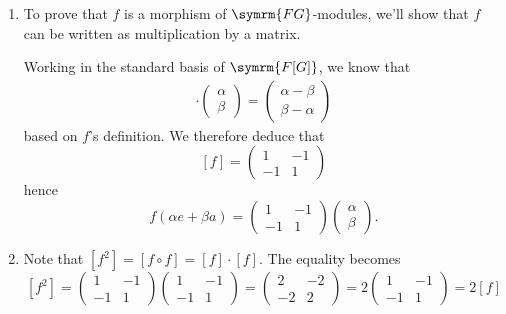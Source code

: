\begin{solution}
\begin{enumerate}[1)]
    \item To prove that \(f\) is a morphism of \(\symrm{FG}\)-modules, we'll show that \(f\) can be written as multiplication by a matrix.
    
    Working in the standard basis of \(\symrm{F[G]}\), we know that
    \begin{align*}
        [f] \cdot \begin{pmatrix} \alpha \\ \beta \end{pmatrix} = \begin{pmatrix}
            \alpha - \beta \\
            \beta - \alpha
        \end{pmatrix}
    \end{align*}
    based on \(f\)'s definition. We therefore deduce that
    \[
        [f] = \begin{pmatrix}
            1 & -1 \\
            -1 & 1
        \end{pmatrix}
    \]
    hence
    \[
        f(\alpha e + \beta a) = \begin{pmatrix}
            1 & -1 \\
            -1 & 1
        \end{pmatrix} \begin{pmatrix}
            \alpha \\
            \beta
        \end{pmatrix}.
    \]
    
    \item Note that \([f^2] = [f \circ f] = [f] \cdot [f]\). The equality becomes
    \[
        [f^2] = \begin{pmatrix}
            1 & -1 \\
            -1 & 1
        \end{pmatrix} \begin{pmatrix}
            1 & -1 \\
            -1 & 1
        \end{pmatrix} =
        \begin{pmatrix}
            2 & -2 \\
            -2 & 2
        \end{pmatrix} =
        2 \begin{pmatrix}
            1 & -1 \\
            -1 & 1
        \end{pmatrix} =
        2 [f]
    \]
    

\end{enumerate}
\end{solution}
